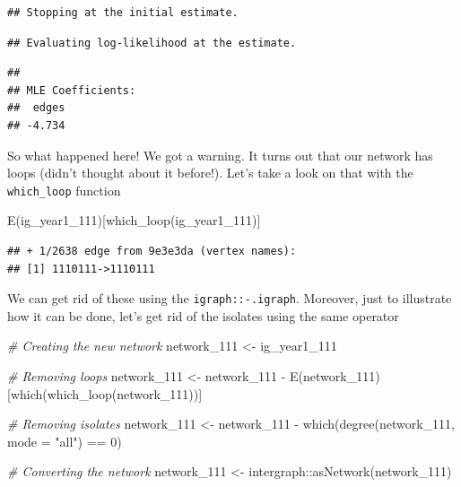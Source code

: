 \documentclass[
]{book}
\newenvironment{Shaded}{\begin{snugshade}}{\end{snugshade}}
\newcommand{\AttributeTok}[1]{\textcolor[rgb]{0.77,0.63,0.00}{#1}}
\newcommand{\CommentTok}[1]{\textcolor[rgb]{0.56,0.35,0.01}{\textit{#1}}}
\newcommand{\DecValTok}[1]{\textcolor[rgb]{0.00,0.00,0.81}{#1}}
\newcommand{\FunctionTok}[1]{\textcolor[rgb]{0.00,0.00,0.00}{#1}}
\newcommand{\NormalTok}[1]{#1}
\newcommand{\OtherTok}[1]{\textcolor[rgb]{0.56,0.35,0.01}{#1}}
\newcommand{\SpecialCharTok}[1]{\textcolor[rgb]{0.00,0.00,0.00}{#1}}
\newcommand{\StringTok}[1]{\textcolor[rgb]{0.31,0.60,0.02}{#1}}
\begin{document}
\begin{verbatim}
## Stopping at the initial estimate.
\end{verbatim}

\begin{verbatim}
## Evaluating log-likelihood at the estimate.
\end{verbatim}

\begin{verbatim}
## 
## MLE Coefficients:
##  edges  
## -4.734
\end{verbatim}

So what happened here! We got a warning. It turns out that our network has loops (didn't thought about it before!). Let's take a look on that with the \texttt{which\_loop} function

\begin{Shaded}
\begin{Highlighting}[]
\FunctionTok{E}\NormalTok{(ig\_year1\_111)[}\FunctionTok{which\_loop}\NormalTok{(ig\_year1\_111)]}
\end{Highlighting}
\end{Shaded}

\begin{verbatim}
## + 1/2638 edge from 9e3e3da (vertex names):
## [1] 1110111->1110111
\end{verbatim}

We can get rid of these using the \texttt{igraph::-.igraph}. Moreover, just to illustrate how it can be done, let's get rid of the isolates using the same operator

\begin{Shaded}
\begin{Highlighting}[]
\CommentTok{\# Creating the new network}
\NormalTok{network\_111 }\OtherTok{\textless{}{-}}\NormalTok{ ig\_year1\_111}

\CommentTok{\# Removing loops}
\NormalTok{network\_111 }\OtherTok{\textless{}{-}}\NormalTok{ network\_111 }\SpecialCharTok{{-}} \FunctionTok{E}\NormalTok{(network\_111)[}\FunctionTok{which}\NormalTok{(}\FunctionTok{which\_loop}\NormalTok{(network\_111))]}

\CommentTok{\# Removing isolates}
\NormalTok{network\_111 }\OtherTok{\textless{}{-}}\NormalTok{ network\_111 }\SpecialCharTok{{-}} \FunctionTok{which}\NormalTok{(}\FunctionTok{degree}\NormalTok{(network\_111, }\AttributeTok{mode =} \StringTok{"all"}\NormalTok{) }\SpecialCharTok{==} \DecValTok{0}\NormalTok{)}

\CommentTok{\# Converting the network}
\NormalTok{network\_111 }\OtherTok{\textless{}{-}}\NormalTok{ intergraph}\SpecialCharTok{::}\FunctionTok{asNetwork}\NormalTok{(network\_111)}
\end{Highlighting}
\end{Shaded}
\end{document}
